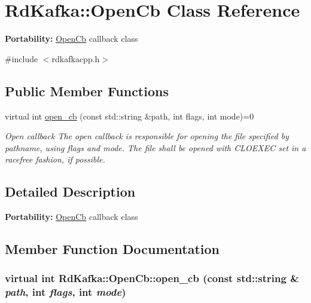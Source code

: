 \hypertarget{classRdKafka_1_1OpenCb}{
\section{RdKafka::OpenCb Class Reference}
\label{classRdKafka_1_1OpenCb}
}


{\bfseries Portability:} \hyperlink{classRdKafka_1_1OpenCb}{OpenCb} callback class  


{\ttfamily \#include $<$rdkafkacpp.h$>$}\subsection*{Public Member Functions}
\begin{DoxyCompactItemize}
\item 
virtual int \hyperlink{classRdKafka_1_1OpenCb_a85d9605e2551aa43eca61f218ad47d54}{open\_\-cb} (const std::string \&path, int flags, int mode)=0
\begin{DoxyCompactList}\small\item\em Open callback The open callback is responsible for opening the file specified by {\ttfamily pathname}, using {\ttfamily flags} and {\ttfamily mode}. The file shall be opened with {\ttfamily CLOEXEC} set in a racefree fashion, if possible. \item\end{DoxyCompactList}\end{DoxyCompactItemize}


\subsection{Detailed Description}
{\bfseries Portability:} \hyperlink{classRdKafka_1_1OpenCb}{OpenCb} callback class 

\subsection{Member Function Documentation}
\hypertarget{classRdKafka_1_1OpenCb_a85d9605e2551aa43eca61f218ad47d54}{
\subsubsection[{open\_\-cb}]{\setlength{\rightskip}{0pt plus 5cm}virtual int RdKafka::OpenCb::open\_\-cb (const std::string \& {\em path}, \/  int {\em flags}, \/  int {\em mode})}}
\label{classRdKafka_1_1OpenCb_a85d9605e2551aa43eca61f218ad47d54}


